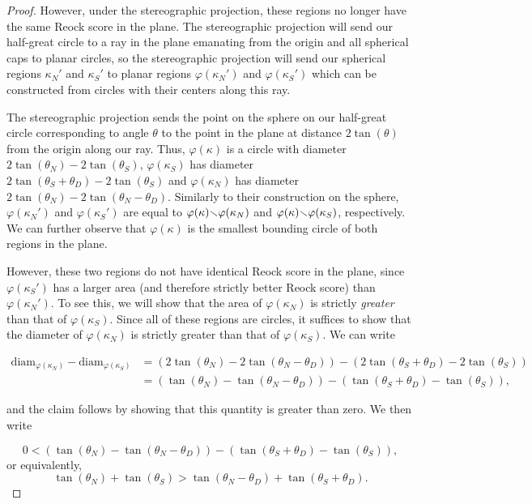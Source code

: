 \begin{proof}
  However, under the stereographic projection, these regions no longer have the same Reock score in the plane.  The stereographic projection will send our half-great circle to a ray in the plane emanating from the origin and all spherical caps to planar circles, so the stereographic projection will send our spherical regions $\kappa_N'$ and $\kappa_S'$ to planar regions $\varphi(\kappa_N')$ and $\varphi(\kappa_S')$ which can be constructed from circles with their centers along this ray.
  
  The stereographic projection sends the point on the sphere on our half-great circle corresponding to angle $\theta$ to the point in the plane at distance $2\tan(\theta)$ from the origin along our ray.  Thus, $\varphi(\kappa)$ is a circle with diameter $2\tan(\theta_N)-2\tan(\theta_S)$, $\varphi(\kappa_S)$ has diameter $2\tan(\theta_S+\theta_D)-2\tan(\theta_S)$ and $\varphi(\kappa_N)$ has diameter $2\tan(\theta_N)-2\tan(\theta_N-\theta_D)$.  Similarly to their construction on the sphere, $\varphi(\kappa_N')$ and $\varphi(\kappa_S')$ are equal to $\varphi(\kappa){\smallsetminus} \varphi(\kappa_N)$ and $\varphi(\kappa){\smallsetminus} \varphi(\kappa_S)$, respectively.  We can further observe that $\varphi(\kappa)$ is the smallest bounding circle of both regions in the plane.
  
  However, these two regions do not have identical Reock score in the plane, since $\varphi(\kappa_S')$ has a larger area (and therefore strictly better Reock score) than $\varphi(\kappa_N')$.  To see this, we will show that the area of $\varphi(\kappa_N)$ is strictly \textit{greater} than that of $\varphi(\kappa_S)$. Since all of these regions are circles, it suffices to show that the diameter of $\varphi(\kappa_N)$ is strictly {greater} than that of $\varphi(\kappa_S)$.  We can write
  
  \begin{align*}
  \mathrm{diam}_{\varphi(\kappa_N)} - \mathrm{diam}_{\varphi(\kappa_S)} &= \left(2\tan(\theta_N) - 2\tan(\theta_N-\theta_D)\right) - \left( 2\tan(\theta_S+\theta_D) - 2\tan(\theta_S) \right)\\
  &= \left(\tan(\theta_N) - \tan(\theta_N-\theta_D)\right) - \left( \tan(\theta_S+\theta_D) - \tan(\theta_S) \right),
  \end{align*}
  
and the claim follows by showing that this quantity is greater than zero.  We then write 

$$0< \left(\tan(\theta_N) - \tan(\theta_N-\theta_D)\right) - \left( \tan(\theta_S+\theta_D) - \tan(\theta_S) \right),$$
 or equivalently,
 $$\tan(\theta_N) + \tan(\theta_S) >   \tan(\theta_N-\theta_D) + \tan(\theta_S+\theta_D). $$


\end{proof}

